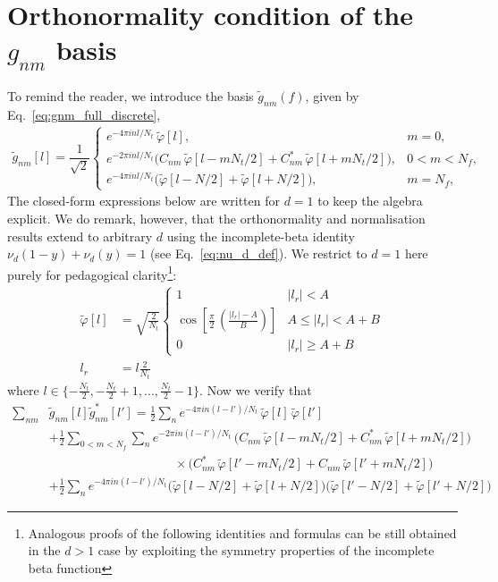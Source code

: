 \documentclass[twocolumn,preprintnumbers,
  superscriptaddress,
  nofootinbib,
  amsmath,
  amssymb,
  aps,
  prd,
  colorlinks=true,
  linkcolor=blue,
  urlcolor=blue,
  citecolor=blue,
  anchorcolor=blue
]{revtex4-2}
\begin{document}
\appendix
\onecolumngrid

\section{Orthonormality condition of the \texorpdfstring{$g_{nm}$}{g_{nm}} basis}\label{app:normality_condition}
%
To remind the reader, we introduce the basis $\tilde g_{nm}(f)$, given by Eq.~\eqref{eq:gnm_full_discrete},
%
\begin{align}
\label{eq:gnm_discr}
\tilde{g}_{nm}[l] =
\dfrac{1}{\sqrt{2}}\begin{cases}
e^{-4\pi i n l/N_t}\, \tilde{\varphi}[l], & m=0, \\[6pt]
e^{-2\pi i n l/N_t}\Big(C_{nm}\,\tilde{\varphi}[l - mN_t/2] + C_{nm}^*\,\tilde{\varphi}[l + mN_t/2]\Big), & 0 < m < N_f, \\[6pt]
e^{-4\pi i n l/N_t}\Big(\tilde{\varphi}[l - N/2] + \tilde{\varphi}[l + N/2]\Big), & m = N_f,
\end{cases}
\end{align}
%
The closed-form expressions below are written
for $d=1$ to keep the algebra explicit. We do remark, however, that the orthonormality and
normalisation results extend to arbitrary $d$ using the incomplete-beta
identity $\nu_d(1-y)+\nu_d(y)=1$ (see Eq.~\eqref{eq:nu_d_def}). We restrict to
$d=1$ here purely for pedagogical clarity\footnote{Analogous proofs of the following identities and formulas can be still obtained in the $d>1$ case by exploiting the symmetry properties of the incomplete beta function}:
%
\begin{align}\label{eq:phi_discrete}
\tilde\varphi[l]&=\sqrt{\frac{2}{N_t}}\begin{cases}
1 & |l_r|<A \\
\cos \left[\frac{\pi}{2}\,\left(
\frac{|l_r|-A}{B}\right)\right] & A \leq|l_r| < A+B \\
0 & |l_r|\geq A+B
\end{cases}\nonumber\\
l_r&=l\frac{2}{N_t}
\end{align}
%
where $l\in\{-\frac{N_t}{2},-\frac{N_t}{2}+1,...,\frac{N_t}{2}-1\}$. Now we verify that
%
\begin{align}
\sum_{nm}&\tilde{g}_{nm}[l]\tilde{g}_{nm}^*[l']=\frac{1}{2}\sum_n e^{-4\pi i n (l-l')/N_t}\, \tilde{\varphi}[l]\,\tilde{\varphi}[l']\nonumber\\
&+\frac{1}{2}\sum_{0<m<N_f}\sum_{n}e^{-2\pi i n (l-l')/N_t}\,\Big(C_{nm}\,\tilde{\varphi}[l - mN_t/2] + C_{nm}^*\,\tilde{\varphi}[l + mN_t/2]\Big)\nonumber\\
&\hspace{10em}\times\Big(C_{nm}^*\,\tilde{\varphi}[l' - mN_t/2] + C_{nm}\,\tilde{\varphi}[l' + mN_t/2]\Big)\nonumber\\
&+\frac{1}{2}\sum_n e^{-4\pi i n (l-l')/N_t}\Big(\tilde{\varphi}[l - N/2] + \tilde{\varphi}[l + N/2]\Big)\Big(\tilde{\varphi}[l' - N/2] + \tilde{\varphi}[l' + N/2]\Big)
\end{align}
\end{document}
